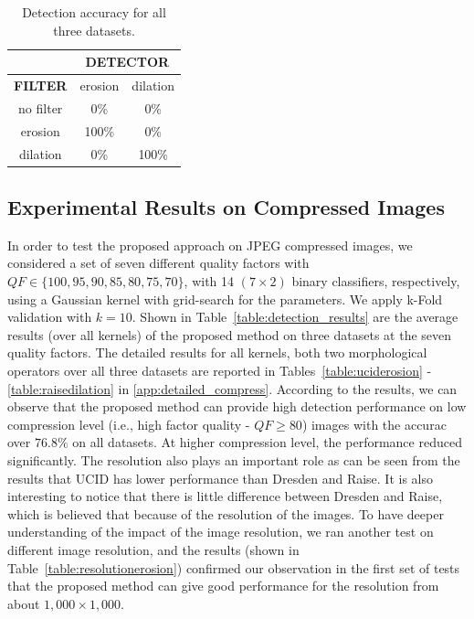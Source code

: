 \documentclass[review]{elsarticle}
\begin{document}
\begin{table}[!ht]
	\centering
	\caption{Detection accuracy for all three datasets.}
	\label{tab1:det_acc}
	\begin{tabular}{|l|l|l}
		\cline{2-3}
		\multicolumn{1}{c|}{}		     & \multicolumn{2}{c|}{\textbf{DETECTOR}}	           				    \\ \hline
		\multicolumn{1}{|c||}{\textbf{FILTER}}    & \multicolumn{1}{c|}{erosion} & \multicolumn{1}{c|}{dilation} \\ \hline
		\multicolumn{1}{|c||}{no filter} & \multicolumn{1}{c|}{0\%} 	& \multicolumn{1}{c|}{0\%}      \\ \hline
		\multicolumn{1}{|c||}{erosion}   & \multicolumn{1}{c|}{100\%}   & \multicolumn{1}{c|}{0\%}      \\ \hline
		\multicolumn{1}{|c||}{dilation}  & \multicolumn{1}{c|}{0\%}     & \multicolumn{1}{c|}{100\%}    \\ \hline
	\end{tabular}
\end{table}

\subsection{Experimental Results on Compressed Images}
\label{sec:compr_res}


In order to test the proposed approach on JPEG compressed images, we considered a set of seven different quality factors with $QF \in \{100,95,90,85,80,75,70\}$, with 14 $(7\times 2)$ binary classifiers, respectively,
using a Gaussian kernel with grid-search for the parameters. We apply k-Fold validation with $k = 10$. Shown in Table~\ref{table:detection_results} are the average results (over all kernels) of the proposed method on three datasets at the seven quality factors. The detailed results for all kernels, both two morphological operators over all three datasets are reported in Tables~\ref{table:uciderosion} - \ref{table:raisedilation} in \ref{app:detailed_compress}. According to the results, we can observe that the proposed method can provide high detection performance on low compression level (i.e., high factor quality - $QF \ge 80$) images with the accurac over $76.8\%$ on all datasets. At higher compression level, the performance reduced significantly. The resolution also plays an important role as can be seen from the results that UCID has lower performance than Dresden and Raise. It is also interesting to notice that there is little difference between Dresden and Raise, which is believed that because of the resolution of the images. To have deeper understanding of the impact of the image resolution, we ran another test on different image resolution, and the results (shown in Table~\ref{table:resolutionerosion}) confirmed our observation in the first set of tests that the proposed method can give good performance for the resolution from about $1,000 \times 1,000$.
\end{document}
